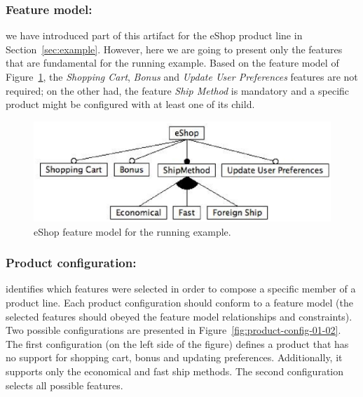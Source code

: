 \documentclass{llncs}
\begin{document}
\subsubsection{Feature model:}

we have introduced part of this artifact for the eShop product line in Section~\ref{sec:example}. However, here we are going to 
present only the features that are fundamental for the running example. Based on the feature model of Figure~\ref{fig:eshop-fm-re}, the \emph{Shopping 
Cart}, \emph{Bonus} and \emph{Update User Preferences} features are not required; on the other had, the feature \emph{Ship Method} is mandatory and 
a specific product might be configured with at least one of its child.  

 \begin{figure}[h]
 \begin{center}
  \includegraphics[scale=0.40]{img/eShop-fm-re.eps}
   \caption{eShop feature model for the running example.}
  \label{fig:eshop-fm-re}
  \end{center}
\end{figure}


\subsubsection{Product configuration:}

identifies which features were selected in order to compose a specific member of a product line. Each product configuration should 
conform to a feature model (the selected features should obeyed the feature model relationships and constraints). Two possible 
configurations are presented in Figure~\ref{fig:product-config-01-02}. The first configuration (on the left side of the figure) defines a
product that has no support for shopping cart, bonus and updating preferences. Additionally, it supports only the economical and fast 
ship methods. The second configuration selects all possible features.  
\end{document}
